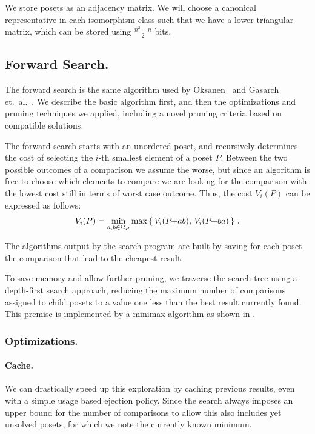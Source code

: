 \documentclass[twoside,leqno,twocolumn]{article}
\newcommand{\pchild}[3]{{#1}\kern-1pt{+}{#2}{#3}}
\begin{document}
We store posets as an adjacency matrix.
We will choose a canonical representative in each isomorphism class such that we have a lower triangular matrix, which can be stored using $\frac{n^2 - n}{2}$ bits.


\subsection{Forward Search.} \label{chapter:forward_search}
The forward search is the same algorithm used by Oksanen~\cite{Oksanen2006} and Gasarch et.\ al\@.~\cite{Gasarch1996}.
We describe the basic algorithm first, and then the optimizations and pruning techniques we applied, including a novel pruning criteria based on compatible solutions.

The forward search starts with an unordered poset, and recursively determines the cost of selecting the $i$-th smallest element of a poset $P$.
Between the two possible outcomes of a comparison we assume the worse, but since an algorithm is free to choose which elements to compare we are looking for the comparison with the lowest cost still in terms of worst case outcome.
Thus, the cost $V_i(P)$ can be expressed as follows:
\begin{equation}
  V_i(P) = \min_{a,b \in \Omega_P} \max \left\{ \,V_i(\pchild{P}{a}{b}),\, V_i(\pchild{P}{b}{a})\,\right\}\,\text{.}
\end{equation}

The algorithms output by the search program are built by saving for each poset the comparison that lead to the cheapest result.

To save memory and allow further pruning, we traverse the search tree using a depth-first search approach, reducing the maximum number of comparisons assigned to child posets to a value one less than the best result currently found.
This premise is implemented by a minimax algorithm as shown in .



\subsubsection{Optimizations.}

\paragraph{Cache.}
We can drastically speed up this exploration by caching previous results, even with a simple usage based ejection policy.
Since the search always imposes an upper bound for the number of comparisons to allow this also includes yet unsolved posets, for which we note the currently known minimum.
\end{document}
